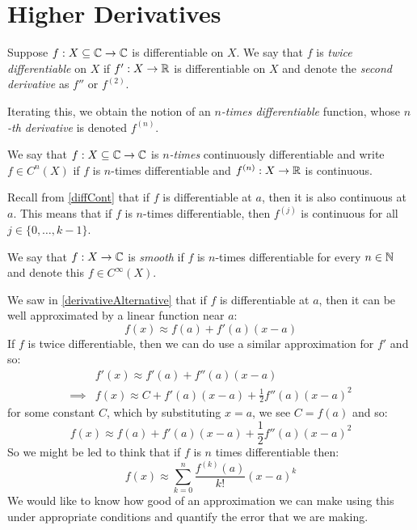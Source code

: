 \documentclass[../main.tex]{subfiles}
\begin{document}
\section{Higher Derivatives}
\begin{definition}
  Suppose $f: X \subseteq \mathbb{C} \to \mathbb{C}$ is differentiable on $X$.
  We say that $f$ is \textit{twice differentiable} on $X$ if $f': X \to \mathbb{R}$ is differentiable on $X$ and denote the \textit{second derivative} as $f''$ or $f^{(2)}$.

  Iterating this, we obtain the notion of an \textit{$n$-times differentiable} function, whose \textit{$n$-th derivative} is denoted $f^{(n)}$.
\end{definition}
\begin{definition}
  We say that $f: X \subseteq \mathbb{C} \to \mathbb{C}$ is \textit{$n$-times} continuously differentiable and write $f \in C^{n}(X)$ if $f$ is $n$-times differentiable and $f^{(n)}: X \to \mathbb{R}$ is continuous. \label{ctsDifferentiable}
\end{definition}
\begin{remark}
  Recall from \cref{diffCont} that if $f$ is differentiable at $a$, then it is also continuous at $a$.
  This means that if $f$ is $n$-times differentiable, then $f^{(j)}$ is continuous for all $j \in \{0, \ldots, k - 1\}$.
\end{remark}
\begin{definition}[Smooth]
  We say that $f: X \to \mathbb{C}$ is \textit{smooth} if $f$ is $n$-times differentiable for every $n \in \mathbb{N}$ and denote this $f \in C^{\infty}(X)$.
\end{definition}
We saw in \cref{derivativeAlternative} that if $f$ is differentiable at $a$, then it can be well approximated by a linear function near $a$:
\[
  f(x) \approx f(a) + f'(a)(x - a)
\]
If $f$ is twice differentiable, then we can do use a similar approximation for $f'$ and so:
\begin{align*}
  &f'(x) \approx f'(a) + f''(a)(x - a) \\
  \implies& f(x) \approx C + f'(a)(x - a) + \frac{1}{2} f''(a)(x - a)^2
\end{align*}
for some constant $C$, which by substituting $x = a$, we see $C = f(a)$ and so:
\[
  f(x) \approx f(a) + f'(a)(x - a) + \frac{1}{2} f''(a)(x - a)^2
\]
So we might be led to think that if $f$ is $n$ times differentiable then:
\[
  f(x) \approx \sum_{k = 0}^{n} \frac{f^{(k)}(a)}{k!}(x - a)^{k}
\]
We would like to know how good of an approximation we can make using this under appropriate conditions and quantify the error that we are making.
\end{document}
